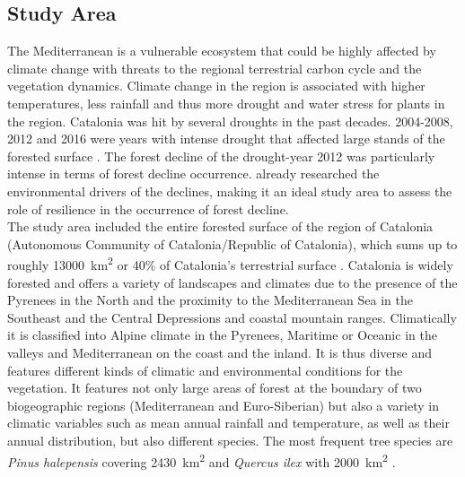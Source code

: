 \subsection{Study Area}\label{subsec:studarea}
The Mediterranean is a vulnerable ecosystem that could be highly affected by climate change \citep{anav2011} with threats to the regional terrestrial carbon cycle and the vegetation dynamics. Climate change in the region is associated with higher temperatures, less rainfall and thus more drought and water stress for plants in the region. Catalonia was hit by several droughts in the past decades. 2004-2008, 2012 and 2016 were years with intense drought that affected large stands of the forested surface \citep{chaparro2017}. The forest decline of the drought-year 2012 was particularly intense in terms of forest decline occurrence. \cite{chaparro2017} already researched the environmental drivers of the declines, making it an ideal study area to assess the role of resilience in the occurrence of forest decline.\\
The study area included the entire forested surface of the region of Catalonia (Autonomous Community of Catalonia/Republic of Catalonia), which sums up to roughly 13000~km\textsuperscript{2} or 40\% of Catalonia's terrestrial surface \citep{chaparro2017}. Catalonia is widely forested and offers a variety of landscapes and climates due to the presence of the Pyrenees in the North and the proximity to the Mediterranean Sea in the Southeast and the Central Depressions and coastal mountain ranges. Climatically it is classified into Alpine climate in the Pyrenees, Maritime or Oceanic in the valleys and Mediterranean on the coast and the inland. It is thus diverse and features different kinds of climatic and environmental conditions for the vegetation. It features not only large areas of forest at the boundary of two biogeographic regions (Mediterranean and Euro-Siberian) but also a variety in climatic variables such as mean annual rainfall and temperature, as well as their annual distribution, but also different species. The most frequent tree species are \textit{Pinus halepensis} covering 2430~km\textsuperscript{2} and \textit{Quercus ilex} with 2000~km\textsuperscript{2} \citep[\citeauthor{chaparro2017}, \citeyear{chaparro2017} after][]{creafsol}.\\

